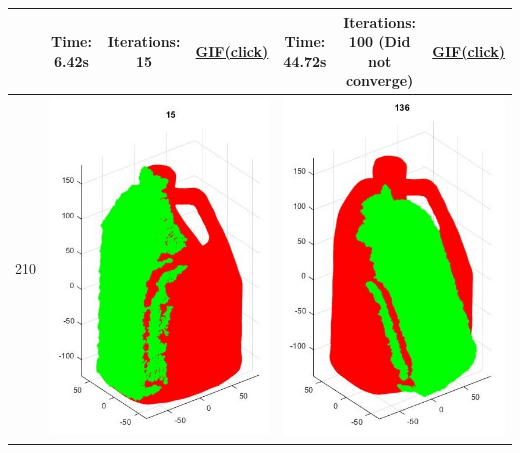 \documentclass[letterpaper, 10 pt, conference]{ieeeconf}  %
\begin{document}
\begin{table}
\begin{tabular}{ccccccc}
 & Time: 6.42s& Iterations: 15& \href{http://gph.is/1rg24Wp}{\textbf{GIF(click)}} & Time: 44.72s & Iterations: 100 (Did not converge)& \href{http://gph.is/1rPJGo2}{\textbf{GIF(click)}}\\ 
\midrule
210 & \multicolumn{3}{c}{\includegraphics[scale=0.43]{l210p.jpg}} & \multicolumn{3}{c}{\includegraphics[scale=0.43]{l210o.jpg}}\\ 

\end{tabular}
\end{table}
\end{document}
